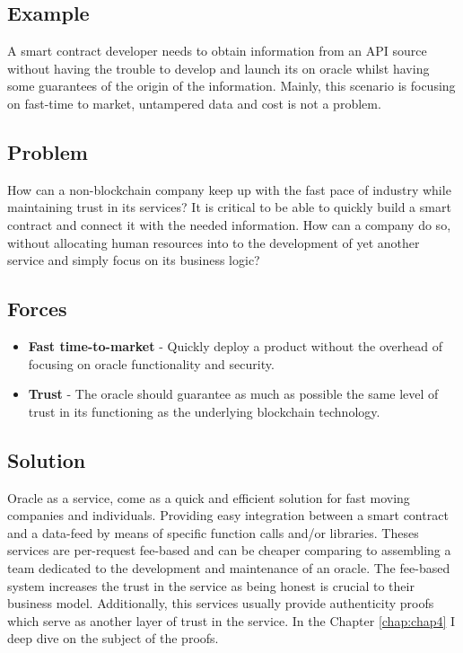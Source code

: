 \subsection{Example}
A smart contract developer needs to obtain information from an API source without having the trouble to develop and launch its on oracle whilst having some guarantees of the origin of the information. Mainly, this scenario is focusing on fast-time to market, untampered data and cost is not a problem.


\subsection{Problem}
How can a non-blockchain company keep up with the fast pace of industry while maintaining trust in its services? It is critical to be able to quickly build a smart contract and connect it with the needed information. How can a company do so, without allocating human resources into to the development of yet another service and simply focus on its business logic?

\subsection{Forces}

\begin{itemize}
  \item \textbf{Fast time-to-market} - Quickly deploy a product without the overhead of focusing on oracle functionality and security.
  \item \textbf{Trust} - The oracle should guarantee as much as possible the same level of trust in its functioning as the underlying blockchain technology.
\end{itemize}


\subsection{Solution}
Oracle as a service, come as a quick and efficient solution for fast moving companies and individuals. Providing easy integration between a smart contract and a data-feed by means of specific function calls and/or libraries. Theses services are per-request fee-based and can be cheaper comparing to assembling a team dedicated to the development and maintenance of an oracle. The fee-based system increases the trust in the service as being honest is crucial to their business model. Additionally, this services usually provide authenticity proofs which serve as another layer of trust in the service. In the Chapter \ref{chap:chap4} I deep dive on the subject of the proofs.


